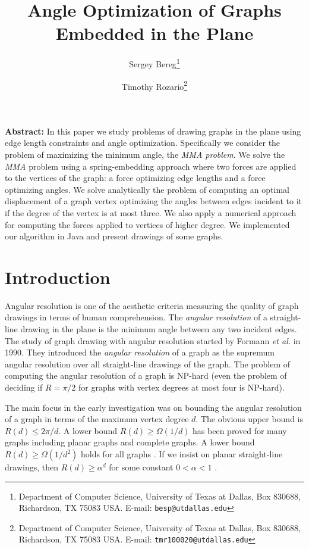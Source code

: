 \documentclass[10pt]{article}
\title{Angle Optimization of Graphs Embedded in the Plane}
\author{Sergey Bereg\thanks{
Department of Computer Science,
University of Texas at Dallas,
Box 830688,
Richardson, TX 75083
USA. E-mail: {\tt besp@utdallas.edu}
}
\and
Timothy Rozario\thanks{
Department of Computer Science,
University of Texas at Dallas,
Box 830688,
Richardson, TX 75083
USA. E-mail: {\tt tmr100020@utdallas.edu}
}
}
\date{}
\newcommand{\etal}{\textit{et al.}}
\begin{document}
\maketitle



{\bf Abstract:}
In this paper we study problems of drawing graphs in the plane using 
edge length constraints and angle optimization. Specifically we consider the problem of  
maximizing the minimum angle, the {\em MMA problem}. 
We solve the {\em MMA} problem using a spring-embedding approach where two forces are applied to the vertices of the graph: a force optimizing edge lengths and a force optimizing angles. We solve analytically the problem of computing an optimal displacement of a graph vertex optimizing the angles between edges incident to it if the degree of the vertex is at most three. We also apply a numerical approach for  computing the forces applied to vertices of higher degree. We implemented our algorithm in Java and present drawings of some graphs.



\section{Introduction}

Angular resolution is one of the aesthetic criteria measuring the quality of graph drawings in terms of human comprehension. 
The {\em angular resolution} of a straight-line drawing in the plane is the minimum angle between any two incident edges.    
The study of graph drawing with angular resolution started by Formann \etal \cite{formann93} 
in 1990. They introduced the {\em angular resolution} of a graph as the supremum angular resolution over all straight-line drawings of the graph. The problem of computing the angular resolution of a graph is NP-hard (even the problem of deciding if $R=\pi/2$ for graphs with vertex degrees at most four is NP-hard).   

The main focus in the early investigation \cite{formann93,mp-arpg-94} was on bounding the angular resolution of a graph in terms of the maximum vertex degree $d$. The obvious upper bound is $R(d)\le 2\pi/d$. A lower bound $R(d)\ge \Omega(1/d)$ has been proved \cite{formann93}  for many graphs including planar graphs and complete graphs. 
A lower bound $R(d)\ge \Omega(1/d^2)$ holds for all graphs \cite{formann93}.
If we insist on planar straight-line drawings, then  $R(d)\ge \alpha^d$ for some constant $0<\alpha<1$ \cite{mp-arpg-94}. 
\end{document}
